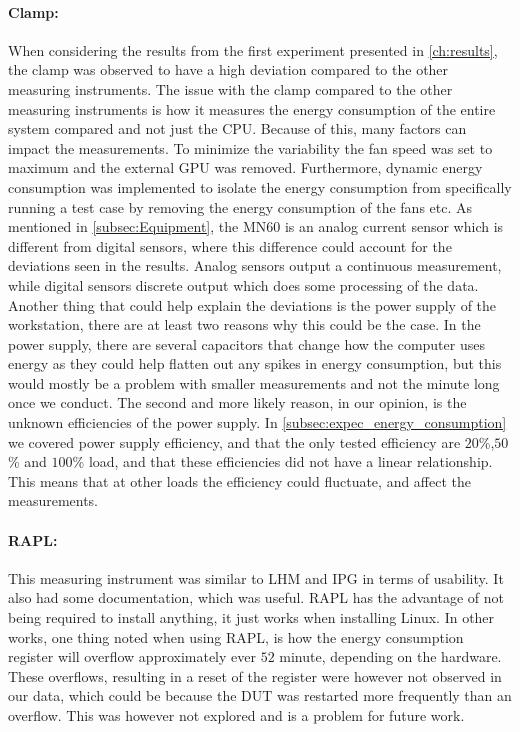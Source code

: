 \paragraph*{Clamp:} When considering the results from the first experiment presented in \cref{ch:results}, the clamp was observed to have a high deviation compared to the other measuring instruments. The issue with the clamp compared to the other measuring instruments is how it measures the energy consumption of the entire system compared and not just the CPU. Because of this, many factors can impact the measurements. To minimize the variability the fan speed was set to maximum and the external GPU was removed. Furthermore, dynamic energy consumption was implemented to isolate the energy consumption from specifically running a test case by removing the energy consumption of the fans etc. As mentioned in \cref{subsec:Equipment}, the MN60 is an analog current sensor which is different from digital sensors, where this difference could account for the deviations seen in the results. Analog sensors output a continuous measurement, while digital sensors discrete output which does some processing of the data.\cite{DigimonsVSAnamons} Another thing that could help explain the deviations is the power supply of the workstation, there are at least two reasons why this could be the case. In the power supply, there are several capacitors that change how the computer uses energy as they could help flatten out any spikes in energy consumption, but this would mostly be a problem with smaller measurements and not the minute long once we conduct\cite{hackenberg2013}. The second and more likely reason, in our opinion, is the unknown efficiencies of the power supply. In \cref{subsec:expec_energy_consumption} we covered power supply efficiency, and that the only tested efficiency are $20$\%,$50$\% and $100$\% load, and that these efficiencies did not have a linear relationship. This means that at other loads the efficiency could fluctuate, and affect the measurements. 


\paragraph*{RAPL:} This measuring instrument was similar to LHM and IPG in terms of usability. It also had some documentation, which was useful. RAPL has the advantage of not being required to install anything, it just works when installing Linux. In other works\cite{RAPL_in_action}, one thing noted when using RAPL, is how the energy consumption register will overflow approximately ever $52$ minute, depending on the hardware. These overflows, resulting in a reset of the register were however not observed in our data, which could be because the DUT was restarted more frequently than an overflow. This was however not explored and is a problem for future work.

